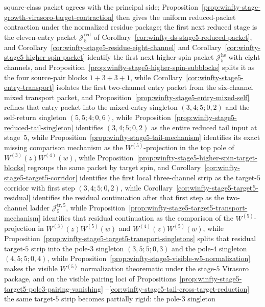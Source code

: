 \begin{proposition}
\begin{enumerate}[label=\textup{(\alph*)}]
  square-class packet agrees with the principal side;
  Proposition~\ref{prop:winfty-stage-growth-virasoro-target-contraction}
  then gives the uniform reduced-packet contraction under the
  normalized residue package; the first next reduced stage is the
  eleven-entry packet $\mathcal{J}_5^{\mathrm{red}}$ of
  Corollary~\ref{cor:winfty-ds-stage5-reduced-packet}, and
  Corollary~\ref{cor:winfty-stage5-residue-eight-channel} and
  Corollary~\ref{cor:winfty-stage5-higher-spin-packet} identify the
  first next higher-spin packet $\mathcal{J}_5^{\mathrm{hs}}$ with
  eight channels, and
  Proposition~\ref{prop:winfty-stage5-higher-spin-subblocks} splits it
  as the four source-pair blocks $1+3+3+1$, while
  Corollary~\ref{cor:winfty-stage5-entry-transport} isolates the first
  two-channel entry packet from the six-channel mixed transport packet,
  and
  Proposition~\ref{prop:winfty-stage5-entry-mixed-self} refines that
  entry packet into the mixed-entry singleton $(3,4;5;0,2)$ and the
  self-return singleton $(5,5;4;0,6)$, while
  Proposition~\ref{prop:winfty-stage5-reduced-tail-singleton}
  identifies $(3,4;5;0,2)$ as the entire reduced tail input at stage~$5$,
  while Proposition~\ref{prop:winfty-stage5-tail-mechanism} identifies
  its exact missing comparison mechanism as the $W^{(5)}$-projection in
  the top pole of $W^{(3)}(z)W^{(4)}(w)$,
  while
  Proposition~\ref{prop:winfty-stage5-higher-spin-target-blocks}
  regroups the same packet by target spin, and
  Corollary~\ref{cor:winfty-stage5-target5-corridor} identifies the
  first local three-channel strip as the target-$5$ corridor with first
  step $(3,4;5;0,2)$, while
  Corollary~\ref{cor:winfty-stage5-target5-residual} identifies the
  residual continuation after that first step as the two-channel ladder
  $\mathcal{J}_5^{\mathrm{tr},5}$, while
  Proposition~\ref{prop:winfty-stage5-target5-transport-mechanism}
  identifies that residual continuation as the comparison of the
  $W^{(5)}$-projection in $W^{(3)}(z)W^{(5)}(w)$ and
  $W^{(4)}(z)W^{(5)}(w)$, while
  Proposition~\ref{prop:winfty-stage5-target5-transport-singletons}
  splits that residual target-$5$ strip into the pole-$3$ singleton
  $(3,5;5;0,3)$ and the pole-$4$ singleton $(4,5;5;0,4)$, while
  Proposition~\ref{prop:winfty-stage5-visible-w5-normalization} makes
  the visible $W^{(5)}$ normalization theorematic under the stage-$5$
  Virasoro package, and on the visible pairing loci of
  Propositions~\ref{prop:winfty-stage5-target5-pole3-pairing-vanishing}
  --\ref{cor:winfty-stage5-tail-cross-target-reduction} the same
  target-$5$ strip becomes partially rigid: the pole-$3$ singleton

\end{enumerate}
\end{proposition}
